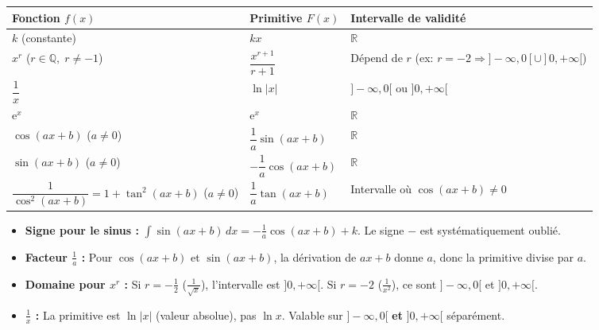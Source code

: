 \documentclass[11pt]{article}
\begin{document}
\begin{aretenir}
\begin{center}
\begin{tabularx}{\linewidth}{|l|X|l|}\hline
\rowcolor{popblue!40} \textbf{Fonction $f(x)$} & \textbf{Primitive $F(x)$} & \textbf{Intervalle de validité} \\ \hline
$k$ (constante) & $kx$ & $\mathbb{R}$ \\ \hline
$x^r$ \quad ($r \in \mathbb{Q},\; r \neq -1$) & $\dfrac{x^{r+1}}{r+1}$ & Dépend de $r$ (ex: $r=-2 \Rightarrow ]-\infty,0[\cup]0,+\infty[$) \\ \hline
$\dfrac{1}{x}$ & $\ln|x|$ & $]-\infty,0[$ ou $]0,+\infty[$ \\ \hline
$\mathrm{e}^{x}$ & $\mathrm{e}^{x}$ & $\mathbb{R}$ \\ \hline
$\cos(ax+b)$ \quad ($a \neq 0$) & $\dfrac{1}{a}\sin(ax+b)$ & $\mathbb{R}$ \\ \hline
$\sin(ax+b)$ \quad ($a \neq 0$) & $-\dfrac{1}{a}\cos(ax+b)$ & $\mathbb{R}$ \\ \hline
$\dfrac{1}{\cos^2(ax+b)} = 1+\tan^2(ax+b)$ \quad ($a \neq 0$) & $\dfrac{1}{a}\tan(ax+b)$ & Intervalle où $\cos(ax+b)\neq 0$ \\ \hline
\end{tabularx}
\end{center}
\end{aretenir}

\begin{attention}
\begin{itemize}
  \item \textbf{Signe pour le sinus :} $\int \sin(ax+b)\,dx = -\frac{1}{a}\cos(ax+b) + k$. Le signe $-$ est systématiquement oublié.
  \item \textbf{Facteur $\frac{1}{a}$ :} Pour $\cos(ax+b)$ et $\sin(ax+b)$, la dérivation de $ax+b$ donne $a$, donc la primitive divise par $a$.
  \item \textbf{Domaine pour $x^r$ :} Si $r = -\frac{1}{2}$ ($\frac{1}{\sqrt{x}}$), l'intervalle est $]0,+\infty[$. Si $r=-2$ ($\frac{1}{x^2}$), ce sont $]-\infty,0[$ et $]0,+\infty[$.
  \item \textbf{$\frac{1}{x}$ :} La primitive est $\ln|x|$ (valeur absolue), pas $\ln x$. Valable sur $]-\infty,0[$ \textbf{et} $]0,+\infty[$ séparément.
\end{itemize}
\end{attention}
\end{document}
